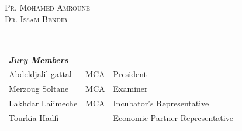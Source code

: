 \begin{titlepage}
\begin{center}
\begin{minipage}{0.375\textwidth}
\begin{flushright}
				\textsc{Pr. Mohamed Amroune}\\
				\textsc{Dr. Issam Bendib}
			\end{flushright}
		\end{minipage}\\[1cm]
		\begin{tabular}{lll}
			\emph{\textbf{Jury Members}} &  &  \\
			Abdeldjalil gattal & MCA & President \\
			Merzoug Soltane & MCA & Examiner \\
			Lakhdar Laiimeche & MCA & Incubator's Representative \\
			Tourkia Hadfi &  & Economic Partner Representative \\
		\end{tabular}
		\vfill
		\@date
	\end{center}
\end{titlepage}
